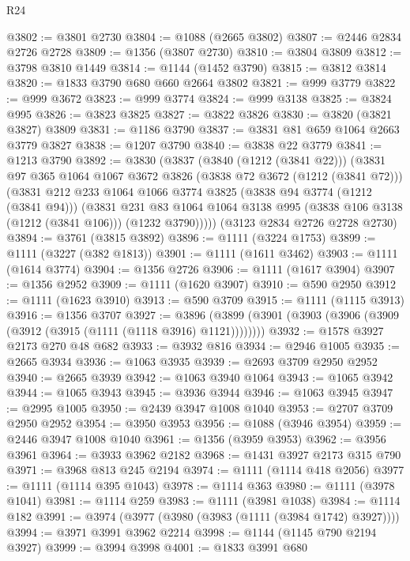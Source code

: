 \begin{lexlean}{R24}
\begin{coremodule}
@3802 := @3801 @2730
@3804 := @1088 (@2665 @3802)
@3807 := @2446 @2834 @2726 @2728
@3809 := @1356 (@3807 @2730)
@3810 := @3804 @3809
@3812 := @3798 @3810 @1449
@3814 := @1144 (@1452 @3790)
@3815 := @3812 @3814
@3820 := @1833 @3790 @680 @660 @2664 @3802
@3821 := @999 @3779
@3822 := @999 @3672
@3823 := @999 @3774
@3824 := @999 @3138
@3825 := @3824 @995
@3826 := @3823 @3825
@3827 := @3822 @3826
@3830 := @3820 (@3821 @3827) @3809
@3831 := @1186 @3790
@3837 := @3831 @81 @659 @1064 @2663 @3779 @3827
@3838 := @1207 @3790
@3840 := @3838 @22 @3779
@3841 := @1213 @3790
@3892 := @3830
    (@3837
      (@3840 (@1212 (@3841 @22)))
      (@3831
        @97
        @365
        @1064
        @1067
        @3672
        @3826
        (@3838 @72 @3672 (@1212 (@3841 @72)))
        (@3831
          @212
          @233
          @1064
          @1066
          @3774
          @3825
          (@3838 @94 @3774 (@1212 (@3841 @94)))
          (@3831
            @231
            @83
            @1064
            @1064
            @3138
            @995
            (@3838 @106 @3138 (@1212 (@3841 @106)))
            (@1232 @3790)))))
    (@3123 @2834 @2726 @2728 @2730)
@3894 := @3761 (@3815 @3892)
@3896 := @1111 (@3224 @1753)
@3899 := @1111 (@3227 (@382 @1813))
@3901 := @1111 (@1611 @3462)
@3903 := @1111 (@1614 @3774)
@3904 := @1356 @2726
@3906 := @1111 (@1617 @3904)
@3907 := @1356 @2952
@3909 := @1111 (@1620 @3907)
@3910 := @590 @2950
@3912 := @1111 (@1623 @3910)
@3913 := @590 @3709
@3915 := @1111 (@1115 @3913)
@3916 := @1356 @3707
@3927 := @3896 (@3899 (@3901 (@3903 (@3906 (@3909 (@3912 (@3915 (@1111 (@1118 @3916) @1121))))))))
@3932 := @1578 @3927 @2173 @270 @48 @682
@3933 := @3932 @816
@3934 := @2946 @1005
@3935 := @2665 @3934
@3936 := @1063 @3935
@3939 := @2693 @3709 @2950 @2952
@3940 := @2665 @3939
@3942 := @1063 @3940 @1064
@3943 := @1065 @3942
@3944 := @1065 @3943
@3945 := @3936 @3944
@3946 := @1063 @3945
@3947 := @2995 @1005
@3950 := @2439 @3947 @1008 @1040
@3953 := @2707 @3709 @2950 @2952
@3954 := @3950 @3953
@3956 := @1088 (@3946 @3954)
@3959 := @2446 @3947 @1008 @1040
@3961 := @1356 (@3959 @3953)
@3962 := @3956 @3961
@3964 := @3933 @3962 @2182
@3968 := @1431 @3927 @2173 @315 @790
@3971 := @3968 @813 @245 @2194
@3974 := @1111 (@1114 @418 @2056)
@3977 := @1111 (@1114 @395 @1043)
@3978 := @1114 @363
@3980 := @1111 (@3978 @1041)
@3981 := @1114 @259
@3983 := @1111 (@3981 @1038)
@3984 := @1114 @182
@3991 := @3974 (@3977 (@3980 (@3983 (@1111 (@3984 @1742) @3927))))
@3994 := @3971 @3991 @3962 @2214
@3998 := @1144 (@1145 @790 @2194 @3927)
@3999 := @3994 @3998
@4001 := @1833 @3991 @680

\end{coremodule}
\end{lexlean}
